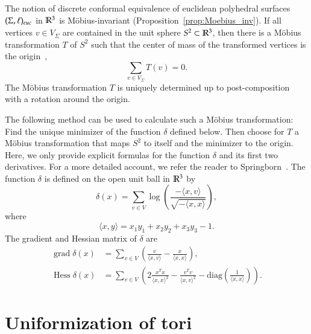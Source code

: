 \documentclass[Thesis]{subfiles}
\begin{document}
The notion of discrete conformal equivalence of euclidean polyhedral
surfaces $(\Sigma,\ell)_{\euc}$ in $\mathbb R^{3}$ is M{\"o}bius-invariant
(Proposition~\ref{prop:Moebius_inv}). If all vertices $v\in
V_{\Sigma}$ are contained in the unit sphere $S^{2}\subset\mathbb R^{3}$,
then there is a M{\"o}bius transformation $T$ of $S^{2}$ such that the
center of mass of the transformed vertices is the
origin~\cite{Springborn05},
\begin{equation*}
\sum_{v\in V_{\Sigma}}T(v) = 0.
\end{equation*}
The M{\"o}bius transformation $T$ is uniquely determined up to
post-composition with a rotation around the origin.

The following method can be used to calculate such a M{\"o}bius
transformation: Find the unique minimizer of the function $\delta$
defined below. Then choose for $T$ a M{\"o}bius transformation that
maps $S^{2}$ to itself and the minimizer to the origin. Here, we only
provide explicit formulas for the function $\delta$ and its first two
derivatives. For a more detailed account, we refer the reader
to Springborn~\cite{Springborn05}. The function $\delta$ is defined on the open
unit ball in $\mathbb R^{3}$ by
\begin{equation}
  \delta(x) = \sum_{v\in V}
  \log\left(\frac{-\langle x,v\rangle}{\sqrt{-\langle x,x\rangle}}\right),
\end{equation}
where 
\begin{equation}
  \langle x,y\rangle=x_1y_1+x_2y_2+x_3y_3-1. 
\end{equation}
The gradient and Hessian matrix of $\delta$ are
\begin{align} 
	\operatorname{grad}\delta(x)
        &= \sum_{v\in V}\left(\frac{v}{\langle x,v\rangle} -
          \frac{x}{\langle x,x\rangle}\right),\\
	 \operatorname{Hess}\delta(x)
        &= \sum_{v\in V}\left(2\frac{x^Tx}{\langle x,x\rangle^2}-\frac{v^Tv}{\langle x,v\rangle^2} - \mathrm{diag}\left(\frac{1}{\langle x,x\rangle}\right)\right).
\end{align}

\section{Uniformization of tori}
\label{sec:tori}
\end{document}
